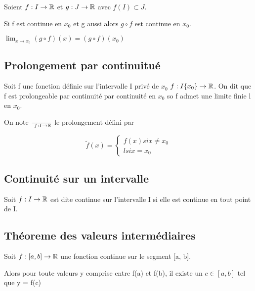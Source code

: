\documentclass[a4paper, 12pt]{article}
\begin{document}
\begin{proposition}
    Soient $f: I \to \mathbb{R}$ et $g: J \to \mathbb{R}$ avec $f(I) \subset J$.

    Si f est continue en $x_0$ et g aussi alors $g \circ f$ est continue en $x_0$.

    $\lim_{x \to x_0}(g \circ f)(x) = (g \circ f)(x_0)$
\end{proposition}

\subsection{Prolongement par continuitué}

\begin{definition}
    Soit f une fonction définie sur l'intervalle I privé de $x_0$
    $f: I\\\{x_0\} \rightarrow \mathbb{R}$. On dit que f est prolongeable par continuité par
    continuité en $x_0$ so f admet une limite finie l en $x_0$.

    On note $\over{~}f: I \rightarrow \mathbb{R}$ le prolongement défini par

    $$
    \tilde{f} (x) =
    \begin{cases}
        f(x) si x \neq x_0 \\
        l si x = x_0
    \end{cases}
    $$
\end{definition}

\subsection{Continuité sur un intervalle}

\begin{definition}
    Soit $f: I \rightarrow \mathbb{R}$ est dite continue sur l'intervalle I si elle est continue en
    tout point de I.
\end{definition}

\subsection{Théoreme des valeurs intermédiaires}

\begin{theorem}
    Soit $f: [a, b] \rightarrow \mathbb{R}$ une fonction continue sur le segment [a, b].

    Alors pour toute valeurs y comprise entre f(a) et f(b), il existe un $c \in [a, b]$ tel que y = f(c)
\end{theorem}
\end{document}
